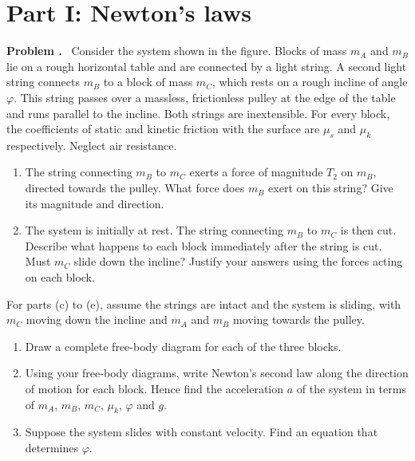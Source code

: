 \documentclass[12pt]{article}
\newcounter{problem}
\newenvironment{problem}[1][]{\refstepcounter{problem}\par\medskip\noindent\textbf{Problem \theproblem#1.}\ }{\par}
\begin{document}
\newpage
\section*{Part I: Newton's laws}
\begin{problem}\label{prob:ramp}
Consider the system shown in the figure. Blocks of mass $m_A$ and $m_B$ lie on a rough horizontal table and are connected by a light string. A second light string connects $m_B$ to a block of mass $m_C$, which rests on a rough incline of angle $\varphi$. This string passes over a massless, frictionless pulley at the edge of the table and runs parallel to the incline. Both strings are inextensible. For every block, the coefficients of static and kinetic friction with the surface are $\mu_s$ and $\mu_k$ respectively. Neglect air resistance.

\begin{center}
\end{center}

\begin{enumerate}[label=(\alph*)]
  \item The string connecting $m_B$ to $m_C$ exerts a force of magnitude $T_2$ on $m_B$, directed towards the pulley. What force does $m_B$ exert on this string? Give its magnitude and direction.
  \item The system is initially at rest. The string connecting $m_B$ to $m_C$ is then cut. Describe what happens to each block immediately after the string is cut. Must $m_C$ slide down the incline? Justify your answers using the forces acting on each block.
\end{enumerate}
For parts (c) to (e), assume the strings are intact and the system is sliding, with $m_C$ moving down the incline and $m_A$ and $m_B$ moving towards the pulley.
\begin{enumerate}[label=(\alph*),resume]
  \item Draw a complete free-body diagram for each of the three blocks.
  \item Using your free-body diagrams, write Newton's second law along the direction of motion for each block. Hence find the acceleration $a$ of the system in terms of $m_A$, $m_B$, $m_C$, $\mu_k$, $\varphi$ and $g$.
  \item Suppose the system slides with constant velocity. Find an equation that determines $\varphi$.
\end{enumerate}
\end{problem}
\end{document}
